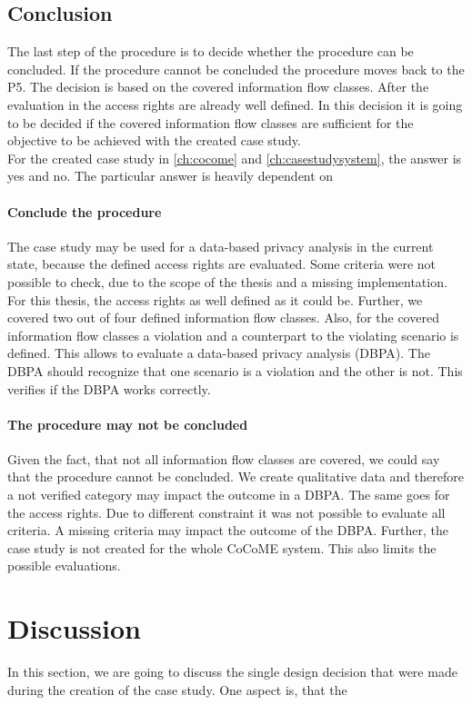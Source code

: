 \subsection{Conclusion}
The last step of the procedure is to decide whether the procedure can be concluded. If the procedure cannot be concluded the procedure moves back to the P5. The decision is based on the covered information flow classes. After the evaluation in %
the access rights are already well defined. In this decision it is going to be decided if the covered information flow classes are sufficient for the objective to be achieved with the created case study. \\
For the created case study in \autoref{ch:cocome} and \autoref{ch:casestudysystem}, the answer is yes and no. The particular answer is heavily dependent on \\
\paragraph{Conclude the procedure}
The case study may be used for a data-based privacy analysis in the current state, because the defined access rights are evaluated. Some criteria were not possible to check, due to the scope of the thesis and a missing implementation. For this thesis, the access rights as well defined as it could be. Further, we covered two out of four defined information flow classes. Also, for the covered information flow classes a violation and a counterpart to the violating scenario is defined. This allows to evaluate a data-based privacy analysis (DBPA). The DBPA should recognize that one scenario is a violation and the other is not. This verifies if the DBPA works correctly. \\
\paragraph{The procedure may not be concluded}
Given the fact, that not all information flow classes are covered, we could say that the procedure cannot be concluded. We create qualitative data and therefore a not verified category may impact the outcome in a DBPA. The same goes for the access rights. Due to different constraint it was not possible to evaluate all criteria. A missing criteria may impact the outcome of the DBPA. Further, the case study is not created for the whole CoCoME system. This also limits the possible evaluations.  
\section{Discussion}
In this section, we are going to discuss the single design decision that were made during the creation of the case study. One aspect is, that the 
